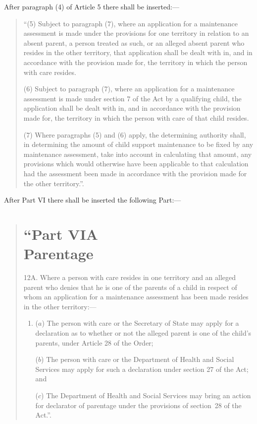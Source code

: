 \documentclass[12pt,a4paper]{article}
\begin{document}
  After paragraph (4) of Article 5 there shall be inserted:—
\begin{quotation}
 “(5) Subject to paragraph (7), where an application for a maintenance assessment is made under the provisions for one territory in relation to an absent parent, a person treated as such, or an alleged absent parent who resides in the other territory, that application shall be dealt with in, and in accordance with the provision made for, the territory in which the person with care resides.

(6) Subject to paragraph (7), where an application for a maintenance assessment is made under section 7 of the Act by a qualifying child, the application shall be dealt with in, and in accordance with the provision made for, the territory in which the person with care of that child resides.

(7) Where paragraphs (5) and (6) apply, the determining authority shall, in determining the amount of child support maintenance to be fixed by any maintenance assessment, take into account in calculating that amount, any provisions which would otherwise have been applicable to that calculation had the assessment been made in accordance with the provision made for the other territory.”.
\end{quotation}

  After Part VI there shall be inserted the following Part:—
\begin{quotation}
 \section*{“Part VIA\\Parentage}

12A.  Where a person with care resides in one territory and an alleged parent who denies that he is one of the parents of a child in respect of whom an application for a maintenance assessment has been made resides in the other territory:—
\begin{enumerate}\item[]
($a$) The person with care or the Secretary of State may apply for a declaration as to whether or not the alleged parent is one of the child’s parents, under Article 28 of the Order;

($b$) The person with care or the Department of Health and Social Services may apply for such a declaration under section 27 of the Act; and

($c$) The Department of Health and Social Services may bring an action for declarator of parentage under the provisions of section~28 of the Act.”.
\end{enumerate}
\end{quotation}
\end{document}
